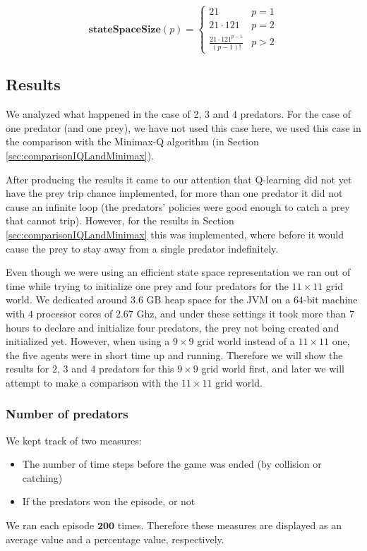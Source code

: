 \[
\mathbf{stateSpaceSize}(p) = 
\begin{cases}
	21 & p = 1\\
    21 \cdot 121 & p = 2 \\
    \frac{21\cdot 121^{p-1}}{(p-1)!}& p > 2
\end{cases}
\]


\subsection{Results}

We analyzed what happened in the case of 2, 3 and 4 predators.
For the case of one predator (and one prey), we have not used this case here, we used this case in the comparison with the Minimax-Q algorithm (in Section \ref{sec:comparisonIQLandMinimax}).

After producing the results it came to our attention that Q-learning did not yet have the prey trip chance implemented, for more than one predator it did not cause an infinite loop (the predators' policies were good enough to catch a prey that cannot trip). However, for the results in Section \ref{sec:comparisonIQLandMinimax}  this was implemented, where before it would cause the prey to stay away from a single predator indefinitely.

Even though we were using an efficient state space representation we ran out of time while trying to initialize one prey and four predators for the $11 \times 11$ grid world. We dedicated around $3.6$ GB heap space for the JVM on a $64$-bit machine with $4$ processor cores of $2.67$ Ghz, and under these settings it took more than $7$ hours to declare and initialize four predators, the prey not being created and initialized yet.
However, when using a $9 \times 9$ grid world instead of a $11 \times 11$ one, the five agents were in short time up and running. 
Therefore we will show the results for $2$, $3$ and $4$ predators for this $9 \times 9$
 grid world first, and later we will attempt to make a comparison with the $11 \times 11$ grid world.



\subsubsection{Number of predators}\label{sec:IQLresults1}
We kept track of two measures:
\begin{itemize}
\item The number of time steps before the game was ended (by collision or catching)
\item If the predators won the episode, or not 
\end{itemize}
We ran each episode $\mathbf{200}$ times. Therefore these measures are displayed as an average value and a percentage value, respectively.

